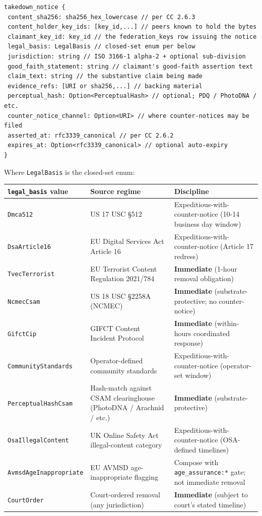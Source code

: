 \documentclass[11pt]{article}
\begin{document}
\begin{lstlisting}
takedown_notice {
 content_sha256: sha256_hex_lowercase // per CC 2.6.3
 content_holder_key_ids: [key_id,...] // peers known to hold the bytes
 claimant_key_id: key_id // the federation_keys row issuing the notice
 legal_basis: LegalBasis // closed-set enum per below
 jurisdiction: string // ISO 3166-1 alpha-2 + optional sub-division
 good_faith_statement: string // claimant's good-faith assertion text
 claim_text: string // the substantive claim being made
 evidence_refs: [URI or sha256,...] // backing material
 perceptual_hash: Option<PerceptualHash> // optional; PDQ / PhotoDNA / etc.
 counter_notice_channel: Option<URI> // where counter-notices may be filed
 asserted_at: rfc3339_canonical // per CC 2.6.2
 expires_at: Option<rfc3339_canonical> // optional auto-expiry
}
\end{lstlisting}

Where \texttt{LegalBasis} is the closed-set enum:


{\footnotesize
\begin{longtable}{|p{5.33cm}|p{5.33cm}|p{5.33cm}|}\hline
\textbf{\texttt{legal\_basis} value} & \textbf{Source regime} & \textbf{Discipline} \\ \hline\endhead
\texttt{Dmca512} & US 17 USC §512 & Expeditious-with-counter-notice (10-14 business day window) \\ \hline
\texttt{DsaArticle16} & EU Digital Services Act Article 16 & Expeditious-with-counter-notice (Article 17 redress) \\ \hline
\texttt{TvecTerrorist} & EU Terrorist Content Regulation 2021/784 & \textbf{Immediate} (1-hour removal obligation) \\ \hline
\texttt{NcmecCsam} & US 18 USC §2258A (NCMEC) & \textbf{Immediate} (substrate-protective; no counter-notice) \\ \hline
\texttt{GifctCip} & GIFCT Content Incident Protocol & \textbf{Immediate} (within-hours coordinated response) \\ \hline
\texttt{CommunityStandards} & Operator-defined community standards & Expeditious-with-counter-notice (operator-set window) \\ \hline
\texttt{PerceptualHashCsam} & Hash-match against CSAM clearinghouse (PhotoDNA / Arachnid / etc.) & \textbf{Immediate} (substrate-protective) \\ \hline
\texttt{OsaIllegalContent} & UK Online Safety Act illegal-content category & Expeditious-with-counter-notice (OSA-defined timelines) \\ \hline
\texttt{AvmsdAgeInappropriate} & EU AVMSD age-inappropriate flagging & Compose with \texttt{age\_assurance:*} gate; not immediate removal \\ \hline
\texttt{CourtOrder} & Court-ordered removal (any jurisdiction) & \textbf{Immediate} (subject to court's stated timeline) \\ \hline
\end{longtable}}
\end{document}
